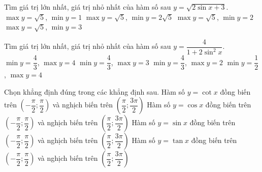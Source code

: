 \begin{ex}%
	Tìm giá trị lớn nhất, giá trị nhỏ nhất của hàm số sau $y=\sqrt{2\sin x+3}$.
	\choice
	{\True $\max y=\sqrt{5}$, $\min y=1$}
	{$\max y=\sqrt{5}$, $\min y=2\sqrt{5}$}
	{$\max y=\sqrt{5}$, $\min y=2$}
	{$\max y=\sqrt{5}$, $\min y=3$}
\end{ex}

\begin{ex}%
	Tìm giá trị lớn nhất, giá trị nhỏ nhất của hàm số sau $y=\dfrac{4}{1+2{\sin}^2x}$.
	\choice
	{\True $\min y=\dfrac{4}{3}$, $\max y=4$}
	{$\min y=\dfrac{4}{3}$, $\max y=3$}
	{$\min y=\dfrac{4}{3}$, $\max y=2$}
	{$\min y=\dfrac{1}{2}$, $\max y=4$}
\end{ex}
\begin{ex}%
	Chọn khẳng định đúng trong các khẳng định sau.
	\choice
	{Hàm số $y=\cot x$ đồng biến trên $\left (-\dfrac{\pi}{2};\dfrac{\pi}{2}\right )$ và nghịch biến trên $\left (\dfrac{\pi}{2};\dfrac{3\pi}{2}\right )$}
	{Hàm số $y=\cos  x$ đồng biến trên $\left (-\dfrac{\pi}{2};\dfrac{\pi}{2}\right )$ và nghịch biến trên $\left (\dfrac{\pi}{2};\dfrac{3\pi}{2}\right )$}
	{\True Hàm số $y=\sin x$ đồng biến trên $\left (-\dfrac{\pi}{2};\dfrac{\pi}{2}\right )$ và nghịch biến trên $\left (\dfrac{\pi}{2};\dfrac{3\pi}{2}\right )$}
	{Hàm số $y=\tan x$ đồng biến trên $\left (-\dfrac{\pi}{2};\dfrac{\pi}{2}\right )$ và nghịch biến trên $\left (\dfrac{\pi}{2};\dfrac{3\pi}{2}\right )$}
\end{ex}

